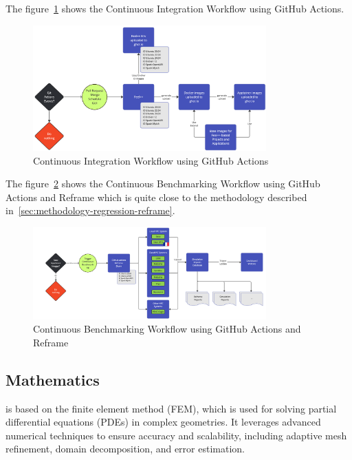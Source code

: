    The figure~\cref{fig:feelpp-ci} shows the \Feelpp Continuous Integration Workflow using GitHub Actions.
    \begin{figure}
        \centering
        \includegraphics[width=0.8\textwidth]{graphics/feelpp/feelpp-ci-workflow.png}
        \caption{\Feelpp Continuous Integration Workflow using GitHub Actions}
        \label{fig:feelpp-ci}
    \end{figure}

    The figure~\cref{fig:feelpp-cb} shows the \Feelpp Continuous Benchmarking Workflow using GitHub Actions and Reframe which is quite close to the methodology described in~\cref{sec:methodology-regression-reframe}.
    \begin{figure}
        \centering
        \includegraphics[width=0.8\textwidth]{graphics/feelpp/feelpp-cb-workflow.png}
        \caption{\Feelpp Continuous Benchmarking Workflow using GitHub Actions and Reframe}
        \label{fig:feelpp-cb}
    \end{figure}

\subsection{Mathematics}
\label{sec:Feelpp:mathematics}
\Feelpp is based on the finite element method (FEM), which is used for solving partial differential equations (PDEs) in complex geometries. 
It leverages advanced numerical techniques to ensure accuracy and scalability, including adaptive mesh refinement, domain decomposition, and error estimation.

